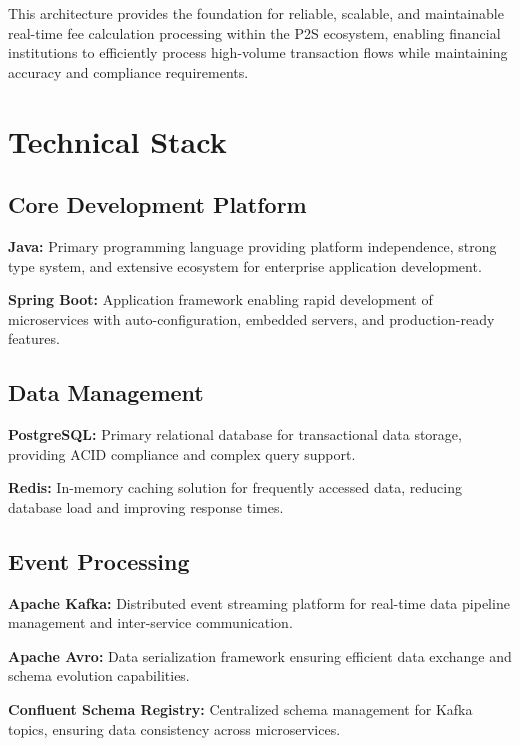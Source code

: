 This architecture provides the foundation for reliable, scalable, and maintainable real-time fee calculation processing within the P2S ecosystem, enabling financial institutions to efficiently process high-volume transaction flows while maintaining accuracy and compliance requirements.







\section{Technical Stack}

\subsection{Core Development Platform}

\textbf{Java:} Primary programming language providing platform independence, strong type system, and extensive ecosystem for enterprise application development.

\textbf{Spring Boot:} Application framework enabling rapid development of microservices with auto-configuration, embedded servers, and production-ready features.

\subsection{Data Management}

\textbf{PostgreSQL:} Primary relational database for transactional data storage, providing ACID compliance and complex query support.

\textbf{Redis:} In-memory caching solution for frequently accessed data, reducing database load and improving response times.

\subsection{Event Processing}

\textbf{Apache Kafka:} Distributed event streaming platform for real-time data pipeline management and inter-service communication.

\textbf{Apache Avro:} Data serialization framework ensuring efficient data exchange and schema evolution capabilities.

\textbf{Confluent Schema Registry:} Centralized schema management for Kafka topics, ensuring data consistency across microservices.

